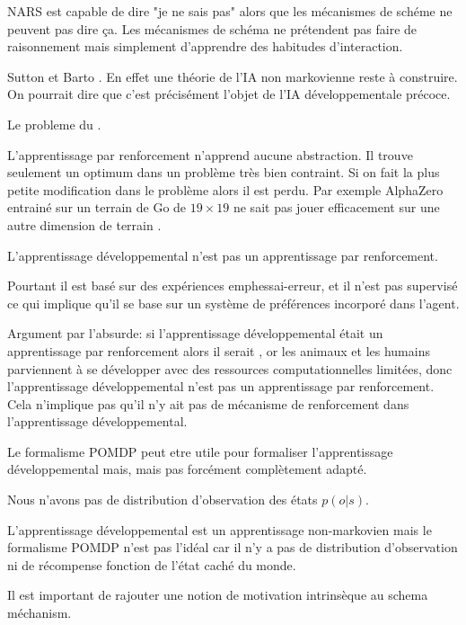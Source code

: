 NARS est capable de dire "je ne sais pas" alors que les mécanismes de schéme ne peuvent pas dire ça.
Les mécanismes de schéma ne prétendent pas faire de raisonnement mais simplement d'apprendre des habitudes d'interaction. 

Sutton et Barto \og {} \fg \cite[p.~65]{sutton_reinforcement_2018}. 
En effet une théorie de l'IA non markovienne reste à construire. 
On pourrait dire que c'est précisément l'objet de l'IA développementale précoce. 

Le probleme du  \cite{minsky_steps_1961}.

L'apprentissage par renforcement n'apprend aucune abstraction. Il trouve seulement un optimum dans un problème très bien contraint. Si on fait la plus petite modification dans le problème alors il est perdu. 
Par exemple AlphaZero entrainé sur un terrain de Go de $19 \times 19$ ne sait pas jouer efficacement sur une autre dimension de terrain \cite[e.g.]{fujita_alphavit_2025}. 

L'apprentissage développemental n'est pas un apprentissage par renforcement. 

Pourtant il est basé sur des expériences emph{essai-erreur}, et il n'est pas supervisé ce qui implique qu'il se base sur un système de préférences incorporé dans l'agent. 

Argument par l'absurde: si l'apprentissage développemental était un apprentissage par renforcement alors il serait , or les animaux et les humains parviennent à se développer avec des ressources computationnelles limitées, donc l'apprentissage développemental n'est pas un apprentissage par renforcement. 
Cela n'implique pas qu'il n'y ait pas de mécanisme de renforcement dans l'apprentissage développemental. 

Le formalisme POMDP peut etre utile pour formaliser l'apprentissage développemental mais, mais pas forcément complètement adapté. 

Nous n'avons pas de distribution d'observation des états $p(o|s)$.


L'apprentissage développemental est un apprentissage non-markovien mais le formalisme POMDP n'est pas l'idéal car il n'y a pas de distribution d'observation ni de récompense fonction de l'état caché du monde. 

Il est important de rajouter une notion de motivation intrinsèque au schema méchanism.

